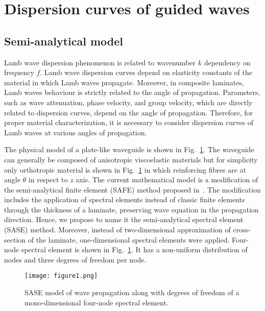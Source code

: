 \documentclass[preprint,12pt]{elsarticle}
\providecommand{\DIFaddbeginFL}{} %
\providecommand{\DIFaddendFL}{} %
\providecommand{\DIFdelbeginFL}{} %
\providecommand{\DIFdelendFL}{} %
\begin{document}
	
	\section{Dispersion curves of guided waves \label{sec:dispersion_curves}}
	\subsection{Semi-analytical model}
	Lamb wave dispersion phenomenon is related to wavenumber  $k$ dependency on frequency $f$. Lamb wave dispersion curves depend on elasticity constants of the material in which Lamb waves propagate. Moreover, in composite laminates, Lamb waves behaviour is strictly related to the angle of propagation. Parameters, such as wave attenuation, phase velocity, and group velocity, which are directly related to dispersion curves, depend on the angle of propagation. Therefore, for proper material characterization, it is necessary to consider dispersion curves of Lamb waves at various angles of propagation.

	The physical model of a plate-like waveguide is shown in Fig.~\ref{fig:layered_composite_SASE}.  The waveguide can generally be composed of anisotropic viscoelastic materials but for simplicity only orthotropic material is shown in Fig.~\ref{fig:layered_composite_SASE} in which reinforcing fibres are at angle $\theta$ in respect to $z$ axis. The current mathematical model is a modification of the semi-analytical finite element (SAFE) method proposed in~\cite{Bartoli2006}. The modification includes the application of spectral elements instead of classic finite elements through the thickness of a laminate, preserving wave equation in the propagation direction. Hence, we propose to name it the semi-analytical spectral element (SASE) method. Moreover, instead of two-dimensional approximation of cross-section of the laminate, one-dimensional spectral elements were applied. Four-node spectral element is shown in Fig.~\ref{fig:layered_composite_SASE}. It has a non-uniform distribution of nodes and three degrees of freedom per node.

		\begin{figure} [h!]
		\centering
		\DIFdelbeginFL %
\DIFdelendFL \DIFaddbeginFL \texttt{[image: figure1.png]}
		\DIFaddendFL %
		\caption{SASE model of wave propagation along with degrees of freedom of a mono-dimensional four-node spectral element.}
		\label{fig:layered_composite_SASE}
	\end{figure}
\end{document}
